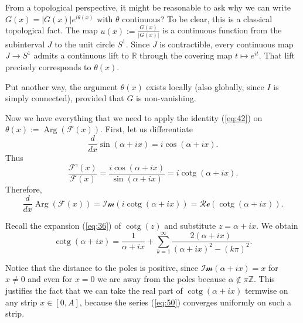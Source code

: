 \documentclass[preprint,12pt,nopreprintline]{elsarticle}
\begin{document}
From a topological perspective, it might be reasonable to ask why we can write $G\left(x\right)=\vert G\left(x\right)\vert e^{i\theta\left(x\right)}$ with $\theta$ continuous? To be clear, this is a classical topological fact. The map $u\left(x\right):=\frac{G\left(x\right)}{\vert G\left(x\right)\vert}$ is a continuous function from the subinterval $J$ to the unit circle $S^1$. Since $J$ is contractible, every continuous map $J\longrightarrow S^1$ admits a continuous lift to $\mathbb{R}$ through the covering map $t\mapsto e^{it}$. That lift precisely corresponds to $\theta\left(x\right)$.

Put another way, the argument $\theta\left(x\right)$ exists locally (also globally, since $I$ is simply connected), provided that $G$ is non-vanishing.

Now we have everything that we need to apply the identity (\ref{eq:42}) on $\theta\left(x\right):=\operatorname{Arg}\left(\mathscr{F}\left(x\right)\right)$. First, let us differentiate 
\begin{equation}\label{eq:47}
\frac{d}{dx}\operatorname{sin}\left(\alpha+ix\right)=i\operatorname{cos}\left(\alpha+ix\right).
\end{equation}
Thus
\begin{equation}\label{eq:48}
\frac{\mathscr{F}’\left(x\right)}{\mathscr{F}\left(x\right)}=\frac{i\operatorname{cos}\left(\alpha+ix\right)}{\operatorname{sin}\left(\alpha+ix\right)}=i\operatorname{cotg}\left(\alpha+ix\right).
\end{equation}
Therefore,
\begin{equation}\label{eq:49}
\frac{d}{dx}\operatorname{Arg}\left(\mathscr{F}\left(x\right)\right)=\mathscr{Im}\left(i\operatorname{cotg}\left(\alpha+ix\right)\right)=\mathscr{Re}\left(\operatorname{cotg}\left(\alpha+ix\right)\right).
\end{equation}

Recall the expansion (\ref{eq:36}) of $\operatorname{cotg}\left(z\right)$ and substitute $z=\alpha+ix$. We obtain
\begin{equation}\label{eq:50}
\operatorname{cotg}\left(\alpha+ix\right)=\frac{1}{\alpha+ix}+\sum_{k=1}^{\infty}\frac{2\left(\alpha+ix\right)}{\left(\alpha+ix\right)^2-\left(k\pi\right)^2}.
\end{equation}

Notice that the distance to the poles is positive, since $\mathscr{Im}\left(\alpha+ix\right)=x$ for $x\neq 0$ and even for $x=0$ we are away from the poles because $\alpha\notin\pi\mathbb{Z}$. This justifies the fact that we can take the real part of $\operatorname{cotg}\left(\alpha+ix\right)$ termwise on any strip $x\in[0,A]$, because the series (\ref{eq:50}) converges uniformly on such a strip.
\end{document}

